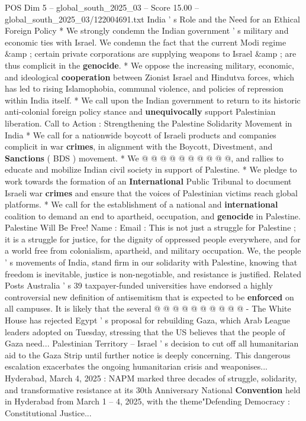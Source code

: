 \begin{textsample}{POS Dim 5 – global\_south\_2025\_03 – Score 15.00 – global\_south\_2025\_03/122004691.txt}
India ' s Role and the Need for an Ethical Foreign Policy * We strongly condemn the Indian government ' s military and economic ties with Israel.
We condemn the fact that the current Modi regime \&amp ; certain private corporations are supplying weapons to Israel \&amp ; are thus complicit in the \textbf{genocide}. * We oppose the increasing military, economic, and ideological \textbf{cooperation} between Zionist Israel and Hindutva forces, which has led to rising Islamophobia, communal violence, and policies of repression within India itself. * We call upon the Indian government to return to its historic anti-colonial foreign policy stance and \textbf{unequivocally} support Palestinian liberation.
Call to Action : Strengthening the Palestine Solidarity Movement in India * We call for a nationwide boycott of Israeli products and companies complicit in war \textbf{crimes}, in alignment with the Boycott, Divestment, and \textbf{Sanctions} ( BDS ) movement. * We @ @ @ @ @ @ @ @ @ @, and rallies to educate and mobilize Indian civil society in support of Palestine. * We pledge to work towards the formation of an \textbf{International} Public Tribunal to document Israeli war \textbf{crimes} and ensure that the voices of Palestinian victims reach global platforms. * We call for the establishment of a national and \textbf{international} coalition to demand an end to apartheid, occupation, and \textbf{genocide} in Palestine.
Palestine Will Be Free!
Name : Email : This is not just a struggle for Palestine ; it is a struggle for justice, for the dignity of oppressed people everywhere, and for a world free from colonialism, apartheid, and military occupation.
We, the people ' s movements of India, stand firm in our solidarity with Palestine, knowing that freedom is inevitable, justice is non-negotiable, and resistance is justified.
Related Posts Australia ' s 39 taxpayer-funded universities have endorsed a highly controversial new definition of antisemitism that is expected to be \textbf{enforced} on all campuses.
It is likely that the several @ @ @ @ @ @ @ @ @ @ - The White House has rejected Egypt ' s proposal for rebuilding Gaza, which Arab League leaders adopted on Tuesday, stressing that the US believes that the people of Gaza need...
Palestinian Territory -- Israel ' s decision to cut off all humanitarian aid to the Gaza Strip until further notice is deeply concerning.
This dangerous escalation exacerbates the ongoing humanitarian crisis and weaponises...
Hyderabad, March 4, 2025 : NAPM marked three decades of struggle, solidarity, and transformative resistance at its 30th Anniversary National \textbf{Convention} held in Hyderabad from March 1 -- 4, 2025, with the theme"Defending Democracy : Constitutional Justice...

\end{textsample}
